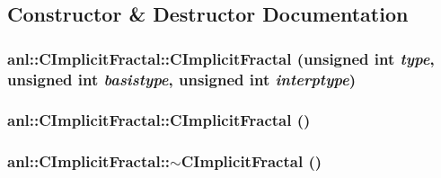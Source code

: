 \subsection{Constructor \& Destructor Documentation}
\hypertarget{classanl_1_1CImplicitFractal_afab4a315bfddf5a9a5ad81a10c4bc0ad}{
\subsubsection[{CImplicitFractal}]{\setlength{\rightskip}{0pt plus 5cm}anl::CImplicitFractal::CImplicitFractal (unsigned int {\em type}, \/  unsigned int {\em basistype}, \/  unsigned int {\em interptype})}}
\label{classanl_1_1CImplicitFractal_afab4a315bfddf5a9a5ad81a10c4bc0ad}
\hypertarget{classanl_1_1CImplicitFractal_adaede5debbc4f0e33d2d45b5c48b73e0}{
\subsubsection[{CImplicitFractal}]{\setlength{\rightskip}{0pt plus 5cm}anl::CImplicitFractal::CImplicitFractal ()}}
\label{classanl_1_1CImplicitFractal_adaede5debbc4f0e33d2d45b5c48b73e0}
\hypertarget{classanl_1_1CImplicitFractal_ac85e41108505f6e634547533fe90b9ec}{
\subsubsection[{$\sim$CImplicitFractal}]{\setlength{\rightskip}{0pt plus 5cm}anl::CImplicitFractal::$\sim$CImplicitFractal ()}}
\label{classanl_1_1CImplicitFractal_ac85e41108505f6e634547533fe90b9ec}


